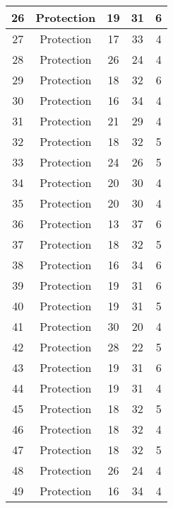 \documentclass[results.tex]{subfiles}
\begin{document}
\begin{center}
\begin{tabular}{| c || c | c | c | c |}
    \hline
    26 & Protection & 19 & 31 & 6 \\ 
    \hline
    27 & Protection & 17 & 33 & 4 \\ 
    \hline
    28 & Protection & 26 & 24 & 4 \\ 
    \hline
    29 & Protection & 18 & 32 & 6 \\ 
    \hline
    30 & Protection & 16 & 34 & 4 \\ 
    \hline
    31 & Protection & 21 & 29 & 4 \\ 
    \hline
    32 & Protection & 18 & 32 & 5 \\ 
    \hline
    33 & Protection & 24 & 26 & 5 \\ 
    \hline
    34 & Protection & 20 & 30 & 4 \\ 
    \hline
    35 & Protection & 20 & 30 & 4 \\ 
    \hline
    36 & Protection & 13 & 37 & 6 \\ 
    \hline
    37 & Protection & 18 & 32 & 5 \\ 
    \hline
    38 & Protection & 16 & 34 & 6 \\ 
    \hline
    39 & Protection & 19 & 31 & 6 \\ 
    \hline
    40 & Protection & 19 & 31 & 5 \\ 
    \hline
    41 & Protection & 30 & 20 & 4 \\ 
    \hline
    42 & Protection & 28 & 22 & 5 \\ 
    \hline
    43 & Protection & 19 & 31 & 6 \\ 
    \hline
    44 & Protection & 19 & 31 & 4 \\ 
    \hline
    45 & Protection & 18 & 32 & 5 \\ 
    \hline
    46 & Protection & 18 & 32 & 4 \\ 
    \hline
    47 & Protection & 18 & 32 & 5 \\ 
    \hline
    48 & Protection & 26 & 24 & 4 \\ 
    \hline
    49 & Protection & 16 & 34 & 4 \\ 
    \hline   \end{tabular}
\end{center}
\end{document}
